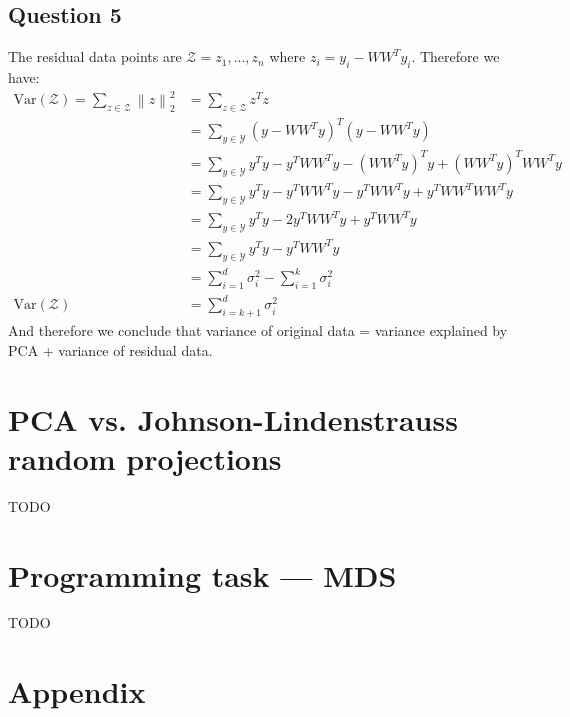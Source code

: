 \documentclass{article}
\begin{document}
\subsection{Question 5}
The residual data points are $\mathcal{Z} = {z_1, ..., z_n}$ where $z_i = y_i - W W^T y_i$. Therefore we have:
\begin{equation}
    \begin{split}
        \text{Var}(\mathcal{Z}) = \sum_{z \in \mathcal{Z}} \left\lVert z \right\rVert^2_2 &= \sum_{z \in \mathcal{Z}} z^T z \\
        &= \sum_{y \in \mathcal{Y}} (y - W W^T y)^T (y - W W^T y) \\
        &= \sum_{y \in \mathcal{Y}} y^T y - y^T W W^T y - (W W^T y)^T y + (W W^T y)^T W W^T y \\
        &= \sum_{y \in \mathcal{Y}} y^T y - y^T W W^T y - y^T W W^T y + y^T W W^T W W^T y \\
        &= \sum_{y \in \mathcal{Y}} y^T y - 2 y^T W W^T y + y^T W W^T y \\
        &= \sum_{y \in \mathcal{Y}} y^T y - y^T W W^T y \\
        &= \sum_{i = 1}^d \sigma_i^2 - \sum_{i = 1}^k \sigma_i^2 \\
        \text{Var}(\mathcal{Z}) &= \sum_{i = k + 1}^d \sigma_i^2
    \end{split}
\end{equation}
And therefore we conclude that variance of original data = variance explained by PCA + variance of residual data.

\section{PCA vs. Johnson-Lindenstrauss random projections}

TODO

\section{Programming task — MDS}

TODO

\newpage
\appendix
\section{Appendix}
\end{document}
